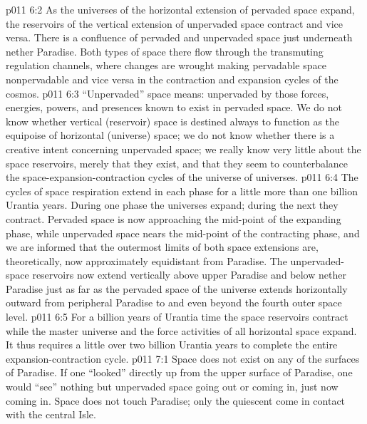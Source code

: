 \vs p011 6:2 As the universes of the horizontal extension of pervaded space expand, the reservoirs of the vertical extension of unpervaded space contract and vice versa. There is a confluence of pervaded and unpervaded space just underneath nether Paradise. Both types of space there flow through the transmuting regulation channels, where changes are wrought making pervadable space nonpervadable and vice versa in the contraction and expansion cycles of the cosmos.
\vs p011 6:3 \pc “Unpervaded” space means: unpervaded by those forces, energies, powers, and presences known to exist in pervaded space. We do not know whether vertical (reservoir) space is destined always to function as the equipoise of horizontal (universe) space; we do not know whether there is a creative intent concerning unpervaded space; we really know very little about the space reservoirs, merely that they exist, and that they seem to counterbalance the space\hyp{}expansion\hyp{}contraction cycles of the universe of universes.
\vs p011 6:4 \pc The cycles of space respiration extend in each phase for a little more than one billion Urantia years. During one phase the universes expand; during the next they contract. Pervaded space is now approaching the mid\hyp{}point of the expanding phase, while unpervaded space nears the mid\hyp{}point of the contracting phase, and we are informed that the outermost limits of both space extensions are, theoretically, now approximately equidistant from Paradise. The unpervaded\hyp{}space reservoirs now extend vertically above upper Paradise and below nether Paradise just as far as the pervaded space of the universe extends horizontally outward from peripheral Paradise to and even beyond the fourth outer space level.
\vs p011 6:5 For a billion years of Urantia time the space reservoirs contract while the master universe and the force activities of all horizontal space expand. It thus requires a little over two billion Urantia years to complete the entire expansion\hyp{}contraction cycle.
\vs p011 7:1 Space does not exist on any of the surfaces of Paradise. If one “looked” directly up from the upper surface of Paradise, one would “see” nothing but unpervaded space going out or coming in, just now coming in. Space does not touch Paradise; only the quiescent  come in contact with the central Isle.
